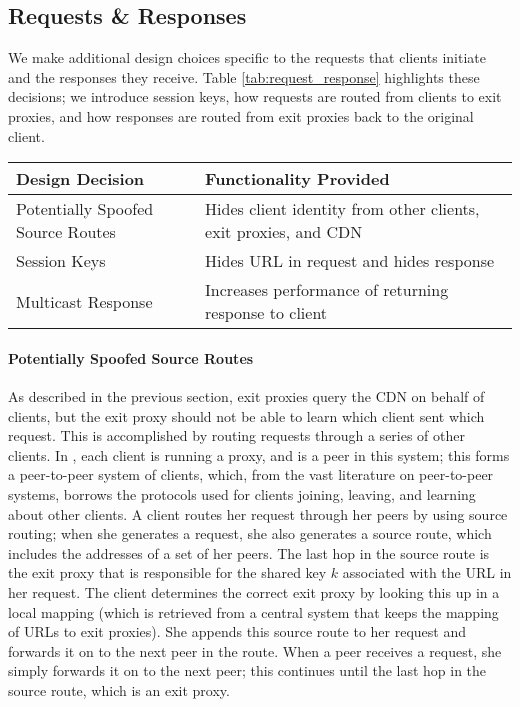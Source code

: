 \subsection{Requests \& Responses}
We make additional design choices specific to the requests that clients initiate and 
the responses they receive.  Table \ref{tab:request_response} highlights these decisions; we 
introduce session keys, how requests are routed from clients to exit proxies, and how responses 
are routed from exit proxies back to the original client.

\begin{table*}[t!]
\centering
\begin{tabular}{| l | l |} 
\hline
 Design Decision & Functionality Provided \\
\hline \hline
 Potentially Spoofed Source Routes & {Hides client identity from other clients, exit proxies, and CDN} \\
\hline
 Session Keys & {Hides URL in request and hides response} \\
\hline
 Multicast Response & {Increases performance of returning response to client} \\
\hline
\end{tabular}
\caption{The design decisions associated with content requests and responses, and what these 
decisions provide.}
\label{tab:request_response}
\end{table*}

\paragraph{Potentially Spoofed Source Routes}
As described in the previous section, exit proxies query the CDN on behalf of clients, but the exit proxy 
should not be able to learn which client sent which request.  This is accomplished by routing requests through 
a series of other clients.  In \system{}, each client is running a proxy, and is a peer in this system; this 
forms a peer-to-peer system of clients, which, from the vast literature on peer-to-peer systems, borrows the 
protocols used for clients joining, leaving, and learning about other clients. A client routes her request through 
her peers by using source routing; when she generates a request, she also generates a source route, which includes 
the addresses of a set of her peers.  The last hop in the source route is the exit proxy that is responsible for the 
shared key $k$ associated with the URL in her request.  The client determines the correct exit proxy by looking this 
up in a local mapping (which is retrieved from a central system that keeps the mapping of URLs to exit proxies).  
She appends this source route to her request and forwards it on to the next peer in the route.  When a peer receives 
a request, she simply forwards it on to the next peer; this continues until the last hop in the source route, which 
is an exit proxy. 

